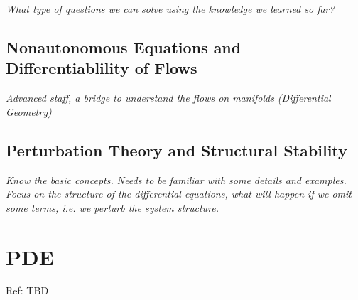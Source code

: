 \documentclass[12pt,oneside]{book}
\begin{document}
    \textit{What type of questions we can solve using the knowledge we learned so far?}
    
    \section{Nonautonomous Equations and Differentiablility of Flows}
    
    \textit{Advanced staff, a bridge to understand the flows on manifolds (Differential Geometry)}
    
    \section{Perturbation Theory and Structural Stability}
    
    \textit{Know the basic concepts. Needs to be familiar with some details and examples. Focus on the structure of the differential equations, what will happen if we omit some terms, i.e. we perturb the system structure.}
    
    \chapter{PDE}
    Ref: TBD
    
%   
    
    
     
\end{document}
